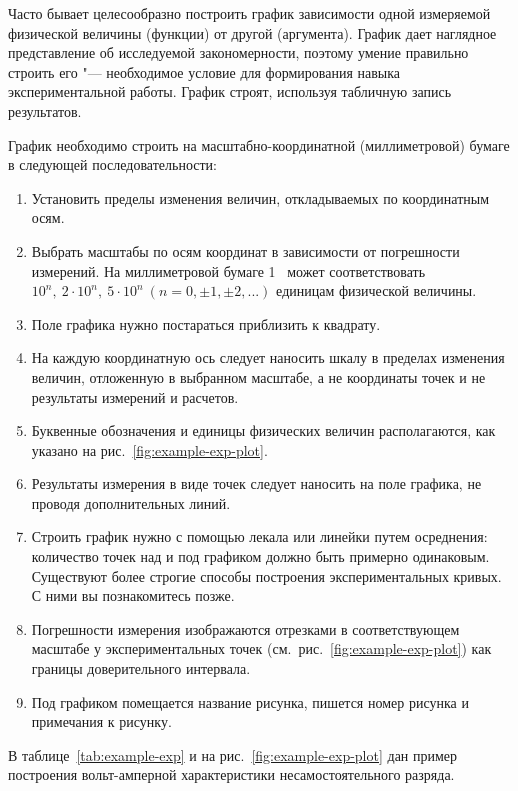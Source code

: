 \documentclass[a4paper, 12pt]{extarticle}
\begin{document}
Часто бывает целесообразно построить график зависимости одной измеряемой физической величины (функции) от другой (аргумента). График дает наглядное представление об исследуемой закономерности, поэтому умение правильно строить его "--- необходимое условие для формирования навыка экспериментальной работы. График строят, используя табличную запись результатов.

График необходимо строить на масштабно-координатной (миллиметровой) бумаге в следующей последовательности:

\begin{enumerate}
  \item Установить пределы изменения величин, откладываемых по координатным осям.
  \item  Выбрать масштабы по осям координат в зависимости от погрешности измерений. На миллиметровой бумаге 1~ может соответствовать $10^n,\ 2\cdot10^n,\ 5\cdot10^n \ (n = 0, \pm 1, \pm 2, ...)$ единицам физической величины.
  \item Поле графика нужно постараться приблизить к квадрату.
  \item На каждую координатную ось следует наносить шкалу в пределах изменения величин, отложенную в выбранном масштабе, а не координаты точек и не результаты измерений и расчетов.
  \item Буквенные обозначения и единицы физических величин располагаются, как указано на рис.~\ref{fig:example-exp-plot}.
  \item Результаты измерения в виде точек следует наносить на поле графика, не проводя дополнительных линий.
  \item Строить график нужно с помощью лекала или линейки путем осреднения: количество точек над и под графиком должно быть примерно одинаковым. Существуют более строгие способы построения экспериментальных кривых. С ними вы познакомитесь позже.
  \item Погрешности измерения изображаются отрезками в соответствующем масштабе у экспериментальных точек (см.~рис.~\ref{fig:example-exp-plot}) как границы доверительного интервала.
  \item Под графиком помещается название рисунка, пишется номер рисунка и примечания к рисунку.
\end{enumerate}

В таблице~\ref{tab:example-exp} и на рис.~\ref{fig:example-exp-plot} дан пример построения вольт-амперной характеристики несамостоятельного разряда.
\end{document}
